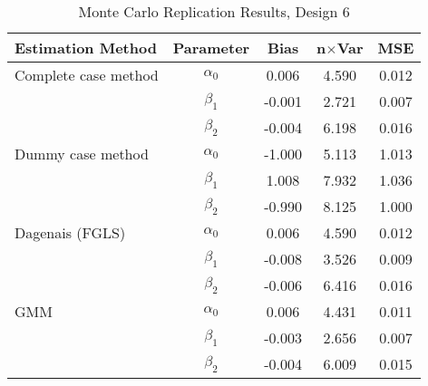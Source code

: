 \begin{table}
\centering
\caption{Monte Carlo Replication Results, Design 6}
\label{table:MCReplicationResultsDesign6}
\begin{tabular}{lcccc}
\toprule
Estimation Method & Parameter & Bias & n$\times$Var & MSE \\
\midrule
Complete case method & $\alpha_0$ & 0.006 & 4.590 & 0.012 \\
 & $\beta_1$ & -0.001 & 2.721 & 0.007 \\
 & $\beta_2$ & -0.004 & 6.198 & 0.016 \\
Dummy case method & $\alpha_0$ & -1.000 & 5.113 & 1.013 \\
 & $\beta_1$ & 1.008 & 7.932 & 1.036 \\
 & $\beta_2$ & -0.990 & 8.125 & 1.000 \\
Dagenais (FGLS) & $\alpha_0$ & 0.006 & 4.590 & 0.012 \\
 & $\beta_1$ & -0.008 & 3.526 & 0.009 \\
 & $\beta_2$ & -0.006 & 6.416 & 0.016 \\
GMM & $\alpha_0$ & 0.006 & 4.431 & 0.011 \\
 & $\beta_1$ & -0.003 & 2.656 & 0.007 \\
 & $\beta_2$ & -0.004 & 6.009 & 0.015 \\
\bottomrule
\end{tabular}
\end{table}
